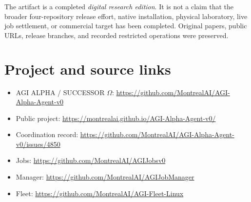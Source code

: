 \documentclass[11pt,a4paper]{article}
\begin{document}
The artifact is a completed \emph{digital research edition}. It is not a claim that the broader four-repository release effort, native installation, physical laboratory, live job settlement, or commercial target has been completed. Original papers, public URLs, release branches, and recorded restricted operations were preserved.

\section*{Project and source links}
\begin{itemize}
\item AGI ALPHA / SUCCESSOR \(\Omega\): \url{https://github.com/MontrealAI/AGI-Alpha-Agent-v0}
\item Public project: \url{https://montrealai.github.io/AGI-Alpha-Agent-v0/}
\item Coordination record: \url{https://github.com/MontrealAI/AGI-Alpha-Agent-v0/issues/4850}
\item Jobs: \url{https://github.com/MontrealAI/AGIJobsv0}
\item Manager: \url{https://github.com/MontrealAI/AGIJobManager}
\item Fleet: \url{https://github.com/MontrealAI/AGI-Fleet-Linux}
\end{itemize}



\end{document}
